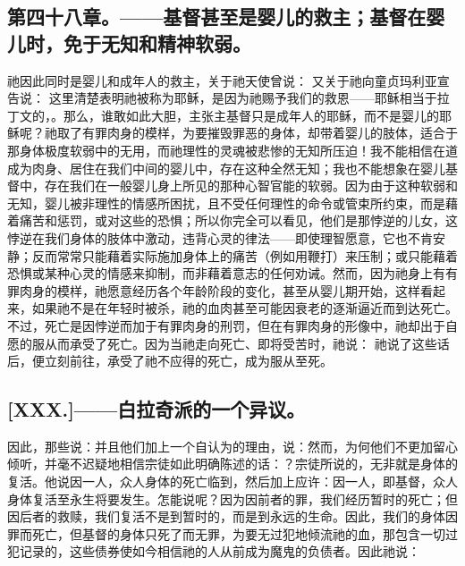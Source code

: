 \subsection{第四十八章。——基督甚至是婴儿的救主；基督在婴儿时，免于无知和精神软弱。}

祂因此同时是婴儿和成年人的救主，关于祂天使曾说： 又关于祂向童贞玛利亚宣告说： 这里清楚表明祂被称为耶稣，是因为祂赐予我们的救恩——耶稣相当于拉丁文的，。那么，谁敢如此大胆，主张主基督只是成年人的耶稣，而不是婴儿的耶稣呢？祂取了有罪肉身的模样，为要摧毁罪恶的身体，却带着婴儿的肢体，适合于那身体极度软弱中的无用，而祂理性的灵魂被悲惨的无知所压迫！我不能相信在道成为肉身、居住在我们中间的婴儿中，存在这种全然无知；我也不能想象在婴儿基督中，存在我们在一般婴儿身上所见的那种心智官能的软弱。因为由于这种软弱和无知，婴儿被非理性的情感所困扰，且不受任何理性的命令或管束所约束，而是藉着痛苦和惩罚，或对这些的恐惧；所以你完全可以看见，他们是那悖逆的儿女，这悖逆在我们身体的肢体中激动，违背心灵的律法——即使理智愿意，它也不肯安静；反而常常只能藉着实际施加身体上的痛苦（例如用鞭打）来压制；或只能藉着恐惧或某种心灵的情感来抑制，而非藉着意志的任何劝诫。然而，因为祂身上有有罪肉身的模样，祂愿意经历各个年龄阶段的变化，甚至从婴儿期开始，这样看起来，如果祂不是在年轻时被杀，祂的血肉甚至可能因衰老的逐渐逼近而到达死亡。不过，死亡是因悖逆而加于有罪肉身的刑罚，但在有罪肉身的形像中，祂却出于自愿的服从而承受了死亡。因为当祂走向死亡、即将受苦时，祂说： 祂说了这些话后，便立刻前往，承受了祂不应得的死亡，成为服从至死。\par


\subsection{[XXX.]——白拉奇派的一个异议。}

因此，那些说：并且他们加上一个自认为的理由，说：然而，为何他们不更加留心倾听，并毫不迟疑地相信宗徒如此明确陈述的话：？宗徒所说的，无非就是身体的复活。他说因一人，众人身体的死亡临到，然后加上应许：因一人，即基督，众人身体复活至永生将要发生。怎能说呢？因为因前者的罪，我们经历暂时的死亡；但因后者的救赎，我们复活不是到暂时的，而是到永远的生命。因此，我们的身体因罪而死亡，但基督的身体只死了而无罪，为要无过犯地倾流祂的血，那包含一切过犯记录的，这些债券使如今相信祂的人从前成为魔鬼的负债者。因此祂说：\par

